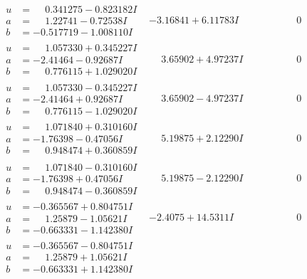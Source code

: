 \documentclass[1p]{elsarticle_modified}
\theoremstyle{definition}
\begin{document}
$$\begin{array}{c|c|c}
\begin{aligned}
u &= \phantom{-}0.341275 - 0.823182 I \\
a &= \phantom{-}1.22741 - 0.72538 I \\
b &= -0.517719 - 1.008110 I\end{aligned}
 & -3.16841 + 6.11783 I & \phantom{-0.000000 } 0 \\ \hline\begin{aligned}
u &= \phantom{-}1.057330 + 0.345227 I \\
a &= -2.41464 - 0.92687 I \\
b &= \phantom{-}0.776115 + 1.029020 I\end{aligned}
 & \phantom{-}3.65902 + 4.97237 I & \phantom{-0.000000 } 0 \\ \hline\begin{aligned}
u &= \phantom{-}1.057330 - 0.345227 I \\
a &= -2.41464 + 0.92687 I \\
b &= \phantom{-}0.776115 - 1.029020 I\end{aligned}
 & \phantom{-}3.65902 - 4.97237 I & \phantom{-0.000000 } 0 \\ \hline\begin{aligned}
u &= \phantom{-}1.071840 + 0.310160 I \\
a &= -1.76398 - 0.47056 I \\
b &= \phantom{-}0.948474 + 0.360859 I\end{aligned}
 & \phantom{-}5.19875 + 2.12290 I & \phantom{-0.000000 } 0 \\ \hline\begin{aligned}
u &= \phantom{-}1.071840 - 0.310160 I \\
a &= -1.76398 + 0.47056 I \\
b &= \phantom{-}0.948474 - 0.360859 I\end{aligned}
 & \phantom{-}5.19875 - 2.12290 I & \phantom{-0.000000 } 0 \\ \hline\begin{aligned}
u &= -0.365567 + 0.804751 I \\
a &= \phantom{-}1.25879 - 1.05621 I \\
b &= -0.663331 - 1.142380 I\end{aligned}
 & -2.4075 + 14.5311 I & \phantom{-0.000000 } 0 \\ \hline\begin{aligned}
u &= -0.365567 - 0.804751 I \\
a &= \phantom{-}1.25879 + 1.05621 I \\
b &= -0.663331 + 1.142380 I\end{aligned}

\end{array}$$
\end{document}

